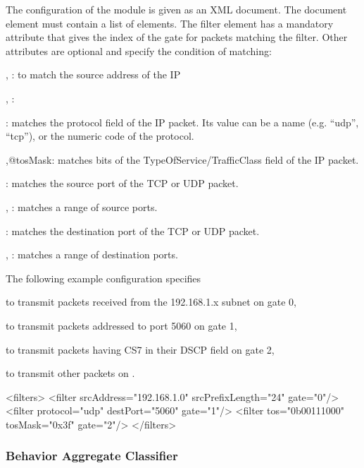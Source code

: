 The configuration of the module is given as an XML document.
The document element must contain a list of  elements.
The filter element has a mandatory  attribute that gives
the index of the gate for packets matching the filter. Other attributes
are optional and specify the condition of matching:
\begin{compactitem}
  \item {}, : to match the source
    address of the IP
  \item {}, :
  \item {}: matches the protocol field of the IP packet.
    Its value can be a name (e.g. ``udp'', ``tcp''),
    or the numeric code of the protocol.
  \item {},{@tosMask}: matches bits of the TypeOfService/TrafficClass
    field of the IP packet.
  \item {}: matches the source port of the TCP or UDP packet.
  \item {}, : matches a range of source ports.
  \item {}: matches the destination port of the TCP or UDP packet.
  \item {}, : matches a range of
     destination ports.
\end{compactitem}

The following example configuration specifies
\begin{compactitem}
  \item to transmit packets received from the 192.168.1.x subnet on gate 0,
  \item to transmit packets addressed to port 5060 on gate 1,
  \item to transmit packets having CS7 in their DSCP field on gate 2,
  \item to transmit other packets on .
\end{compactitem}

\begin{XML}
<filters>
  <filter srcAddress="192.168.1.0" srcPrefixLength="24" gate="0"/>
  <filter protocol="udp" destPort="5060" gate="1"/>
  <filter tos="0b00111000" tosMask="0x3f" gate="2"/>
</filters>
\end{XML}

\subsubsection*{Behavior Aggregate Classifier}

